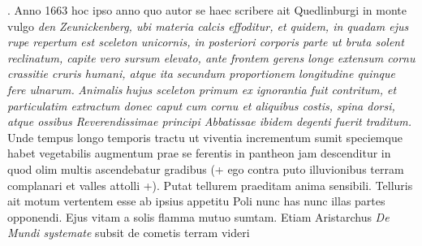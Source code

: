  \pstart {}. Anno 1663  hoc ipso anno quo autor se haec scribere  ait Quedlinburgi\protect{} in monte vulgo \textit{den }\textit{Zeunickenberg}\protect{}\textit{, ubi materia  calcis effoditur, et quidem, in quadam  ejus rupe repertum est sceleton unicornis, in posteriori corporis parte  ut bruta solent reclinatum, capite  vero sursum elevato, ante frontem  gerens longe extensum cornu  crassitie cruris humani, atque ita  secundum proportionem longitudine  quinque fere ulnarum. }\textit{Animalis}\protect{}\textit{ hujus  sceleton primum ex ignorantia  fuit contritum, et particulatim  extractum donec caput }\textit{ cum cornu et aliquibus  costis, spina dorsi, atque ossibus Reverendissimae principi Abbatissae  ibidem degenti fuerit traditum.} Unde  tempus longo temporis tractu ut  viventia incrementum sumit speciemque  habet vegetabilis augmentum prae  se ferentis in pantheon jam descenditur in quod olim multis ascendebatur gradibus (+ ego contra puto illuvionibus terram\protect{} complanari et valles attolli +).\pend \pstart {} Putat tellurem\protect{}  praeditam anima sensibili\protect{}. Telluris\protect{} ait  motum vertentem esse ab ipsius appetitu Poli\protect{} nunc has nunc illas partes opponendi. Ejus vitam a solis\protect{} flamma mutuo sumtam.  Etiam Aristarchus\protect{} \cite{00211}\textit{De Mundi\protect{} systemate} subsit de cometis\protect{} terram\protect{} videri \pend 